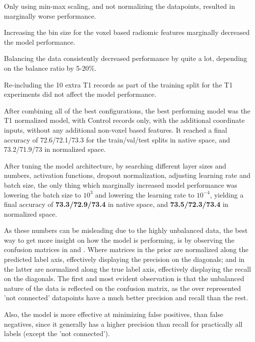 Only using min-max scaling, and not normalizing the datapoints, resulted in marginally worse performance.\par
Increasing the bin size for the voxel based radiomic features marginally decreased the model performance.\par
Balancing the data consistently decreased performance by quite a lot, depending on the balance ratio by 5-20\%.\par
Re-including the 10 extra T1 records as part of the training split for the T1 experiments did not affect the model performance.\par
After combining all of the best configurations, the best performing model was the T1 normalized model, with Control records only, with the additional coordinate inputs, without any additional non-voxel based features. It reached a final accuracy of 72.6/72.1/73.3 for the train/val/test splits in native space, and 73.2/71.9/73 in normalized space.\par
After tuning the model architecture, by searching different layer sizes and numbers, activation functions, dropout normalization, adjusting learning rate and batch size, the only thing which marginally increased model performance was lowering the batch size to $10^3$ and lowering the learning rate to $10^{-4}$, yielding a final accuracy of \textbf{73.3/72.9/73.4} in native space, and \textbf{73.5/72.3/73.4} in normalized space.\par
As these numbers can be misleading due to the highly unbalanced data, the best way to get more insight on how the model is performing, is by observing the confusion matrices in  and . Where matrices in the prior  are normalized along the predicted label axis, effectively displaying the precision on the diagonals; and in the latter  are normalized along the true label axis, effectively displaying the recall on the diagonals. The first and most evident observation is that the unbalanced nature of the data is reflected on the confusion matrix, as the over represented 'not connected' datapoints have a much better precision and recall than the rest.\par
Also, the model is more effective at minimizing false positives, than false negatives, since it generally has a higher precision than recall for practically all labels (except the 'not connected').

